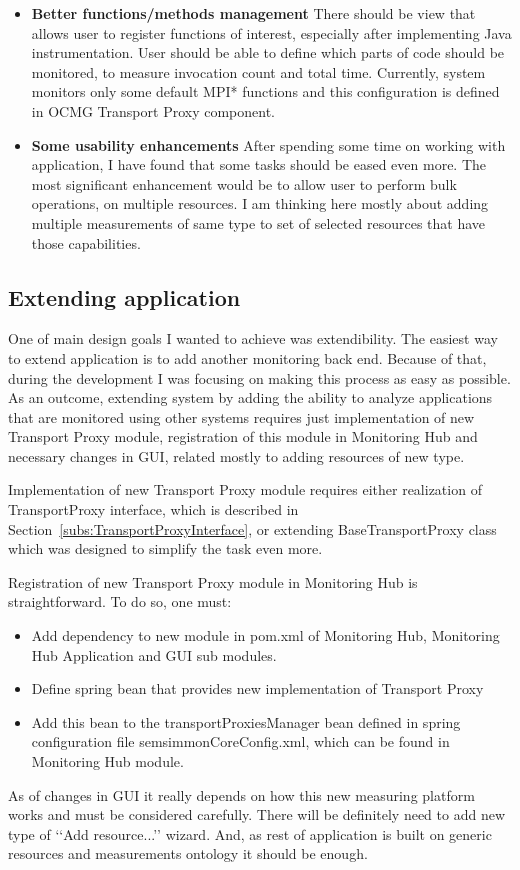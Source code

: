 \begin{itemize}
\item{\bf Better functions/methods management}
There should be view that allows user to register functions of interest, especially after implementing Java instrumentation. User should be able to define which parts of code should be monitored, to measure invocation count and total time. Currently, system monitors only some default MPI* functions and this configuration is defined in OCMG Transport Proxy component.
\item {\bf Some usability enhancements}
After spending some time on working with application, I have found that some tasks should be eased even more. The most significant enhancement would be to allow user to perform bulk operations, on multiple resources. I am thinking here mostly about adding multiple measurements of same type to set of selected resources that have those capabilities. 
\end{itemize}

\subsection{Extending application}

One of main design goals I wanted to achieve was extendibility. The easiest way to extend application is to add another monitoring back end. Because of that, during the development I was focusing on making this process as easy as possible. As an outcome, extending system by adding the ability to analyze applications that are monitored using other systems requires just implementation of new Transport Proxy module, registration of this module in Monitoring Hub and necessary changes in GUI, related mostly to adding resources of new type.

Implementation of new Transport Proxy module requires either realization of TransportProxy interface, which is described in Section~\ref{subs:TransportProxyInterface}, or extending BaseTransportProxy class which was designed to simplify the task even more.

Registration of new Transport Proxy module in Monitoring Hub is straightforward. To do so, one must:

\begin{itemize}
\item Add dependency to new module in pom.xml of Monitoring Hub, Monitoring Hub Application and GUI sub modules.
\item Define spring bean that provides new implementation of Transport Proxy 
\item Add this bean to the transportProxiesManager bean defined in spring configuration file semsimmonCoreConfig.xml, which can be found in Monitoring Hub module.
\end{itemize}

As of changes in GUI it really depends on how this new measuring platform works and must be considered carefully. There will be definitely need to add new type of \lq\lq{}Add resource...\rq\rq{} wizard. And, as rest of application is built on generic resources and measurements ontology it should be enough.
